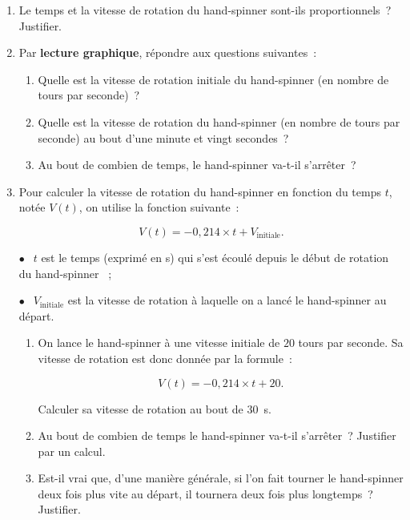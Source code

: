      \medbreak
     \begin{enumerate}
          \item Le temps et la vitesse de rotation du \og hand-spinner \fg{} sont-ils proportionnels~? Justifier.
          \item Par \textbf{lecture graphique}, répondre aux questions suivantes~:
          \begin{enumerate}[label=\alph*.]
               \item Quelle est la vitesse de rotation initiale du \og hand-spinner \fg{} (en nombre de tours par seconde)~?
               \item Quelle est la vitesse de rotation du \og hand-spinner \fg{} (en nombre de tours par seconde) au bout d'une minute et vingt secondes~?
               \item Au bout de combien de temps, le \og hand-spinner \fg{} va-t-il s'arrêter~?
          \end{enumerate}
          \item  Pour calculer la vitesse de rotation du \og hand-spinner \fg{} en fonction du temps $t$, notée $V(t)$, on utilise la fonction suivante~:
          \par
          \[V(t) = - 0,214 \times t + V_{\text{initiale}}.\]
          \par
          $\bullet~~$ $t$ est le temps (exprimé en s) qui s'est écoulé depuis le début de rotation du \og hand-spinner \fg{}~;
          \par
          $\bullet~~$ $V_{\text{initiale}}$ est la vitesse de rotation à laquelle on a lancé le \og hand-spinner \fg{} au départ.
          \begin{enumerate}[label=\alph*.]
               \item On lance le \og hand-spinner \fg{} à une vitesse initiale de $20$ tours par seconde. Sa vitesse de rotation est donc donnée par la formule~:
               \par
               \[V(t) = - 0,214 \times t + 20.\]
               \par
               Calculer sa vitesse de rotation au bout de $30$~s.
               \item Au bout de combien de temps le hand-spinner va-t-il s'arrêter~? Justifier par un calcul.
               \item Est-il vrai que, d'une manière générale, si l'on fait tourner le hand-spinner deux fois plus vite au départ, il tournera deux fois plus longtemps~? Justifier.
          \end{enumerate}
     \end{enumerate}


